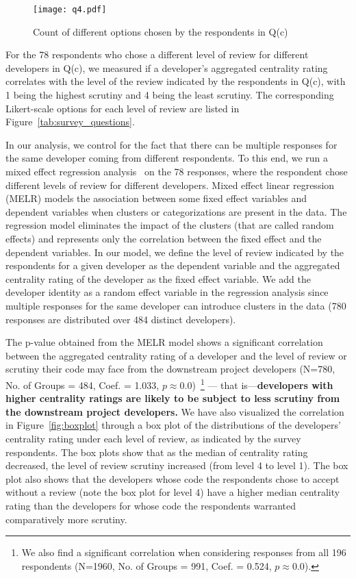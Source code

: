 \documentclass[10pt,journal,compsoc]{IEEEtran}
\begin{document}
\begin{figure}
    \centering
    \texttt{[image: q4.pdf]}
    \caption{Count of different options chosen by the respondents in Q(c)}
    \label{fig:q4}
\end{figure}

For the 78 respondents who chose a different level of review for different developers in Q(c), we measured if a developer's aggregated centrality rating correlates with the level of the review indicated by the respondents in Q(c), with 1 being the highest scrutiny and 4 being the least scrutiny. The corresponding Likert-scale options for each level of review are listed in  Figure~\ref{tab:survey_questions}. 


In our analysis, we control for the fact that there can be multiple responses for the same developer coming from different respondents. To this end, we run a mixed effect regression analysis~\cite{faraway2016extending} on the 78 responses, where the respondent chose different levels of review for different developers. Mixed effect linear regression (MELR) models the association between some fixed effect variables and dependent variables when clusters or categorizations are present in the data. The regression model eliminates the impact of the clusters (that are called random effects) and represents only the correlation between the fixed effect and the dependent variables. In our model, we define the level of review indicated by the respondents for a given developer as the dependent variable and the aggregated centrality rating of the developer as the fixed effect variable. We add the developer identity as a random effect variable in the regression analysis since multiple responses for the same developer can introduce clusters in the data (780 responses are distributed over 484 distinct developers). 

The p-value obtained from the MELR model shows a significant correlation between the aggregated centrality rating of a developer and the level of review or scrutiny their code may face from the downstream project developers (N=780, No. of Groups = 484, Coef. = 1.033, $p \approx 0.0$)~\footnote{We also find a significant correlation when considering responses from all 196 respondents (N=1960, No. of Groups = 991, Coef. = 0.524, $p \approx 0.0$).} — that is—\textbf{developers with higher centrality ratings are likely to be subject to less scrutiny from the downstream project developers.} We have also visualized the correlation in Figure~\ref{fig:boxplot} through a box plot of the distributions of the developers' centrality rating under each level of review, as indicated by the survey respondents. The box plots show that as the median of centrality rating decreased, the level of review scrutiny increased (from level 4 to level 1). The box plot also shows that the developers whose code the respondents chose to accept without a review (note the box plot for level 4) have a higher median centrality rating than the developers for whose code the respondents warranted comparatively more scrutiny.
\end{document}
